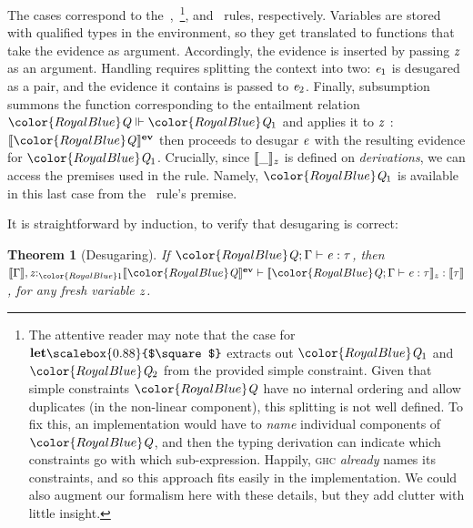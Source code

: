 \documentclass[acmsmall,usenames,dvipsnames,natbib=false,acmthm=false,screen]{acmart}
\newcommand{\constraintcolour}{\color{RoyalBlue}}
\newcommand{\constraintfont}[1]{{\constraintcolour#1}}
\newcommand{\multiplicitycolour}{\color{RoyalBlue}}
\newcommand{\multiplicityfont}[1]{{\multiplicitycolour#1}}
\newcommand{\dsterm}[2]{\llbracket #2 \rrbracket_{#1}}
\newcommand{\dstype}[1]{\llbracket #1 \rrbracket}
\newcommand{\dsevidence}[1]{\llbracket #1 \rrbracket^{\mathbf{ev}}}
\newcommand{\keyword}[1]{\mathbf{#1}}
\newcommand{\klet}{\keyword{let}}
\newcommand{\packbox}{\raisebox{-0.08ex}{\scalebox{0.88}{$\square$}}}
\newcommand{\kunpack}{\klet\packbox}
\theoremstyle{acmplain}
\newtheorem{theorem}{Theorem}[section]
\theoremstyle{acmdefinition}
\begin{document}
The cases correspond to the~,~\footnote{The attentive
reader may note that the case for $\kunpack$ extracts out $  \constraintfont{ \ottnt{Q_{{\mathrm{1}}}} }  $ and $  \constraintfont{ \ottnt{Q_{{\mathrm{2}}}} }  $
from the provided simple constraint. Given that simple constraints $  \constraintfont{ \ottnt{Q} }  $ have no
internal ordering and allow duplicates (in the non-linear component), this splitting
is not well defined. To fix this, an implementation would have to \emph{name} individual
components of $  \constraintfont{ \ottnt{Q} }  $, and then the typing derivation can indicate which constraints
go with which sub-expression. Happily, \textsc{ghc} \emph{already} names its constraints,
and so this approach fits easily in the implementation. We could also augment our formalism
here with these details, but they add clutter with little insight.}, and~ rules, respectively.
Variables are stored with qualified types in the environment, so they get
translated to functions that take the evidence as argument. Accordingly, the evidence
is inserted by passing $ \mathit{z} $ as an argument.
Handling  requires splitting the context into two: $ \mathit{e_{{\mathrm{1}}}} $ is desugared as a pair, and the evidence
it contains is passed to $ \mathit{e_{{\mathrm{2}}}} $. Finally, subsumption summons the function corresponding to the entailment relation $ \constraintfont{ \ottnt{Q} }   \Vdash   \constraintfont{ \ottnt{Q_{{\mathrm{1}}}} } $
and applies it to $ \mathit{z} $ : $  \dsevidence{\constraintfont{ \ottnt{Q} } }  $ then proceeds to desugar $ \mathit{e} $ with the resulting evidence for $  \constraintfont{ \ottnt{Q_{{\mathrm{1}}}} }  $.
Crucially, since $  \dsterm{ \ottmv{z} }{ \_ }  $ is defined on \emph{derivations}, we can access the premises used in the rule.
Namely, $  \constraintfont{ \ottnt{Q_{{\mathrm{1}}}} }  $ is available in this last case from the~ rule's premise.

It is straightforward by induction, to verify that desugaring is correct:
%
\begin{theorem}[Desugaring]
If $ \constraintfont{ \ottnt{Q} }   \ottsym{;}  \Gamma  \vdash  \ottnt{e}  \ottsym{:}  \tau$, then
$ \dstype{ \Gamma }   \ottsym{,}   \ottmv{z} {:}_{  \multiplicityfont{ \ottsym{1} }  }  \dsevidence{\constraintfont{ \ottnt{Q} } }    \vdash   \dsterm{ \ottmv{z} }{  \constraintfont{ \ottnt{Q} }   \ottsym{;}  \Gamma  \vdash  \ottnt{e}  \ottsym{:}  \tau }   \ottsym{:}   \dstype{ \tau } $, for any fresh
variable $ \mathit{z} $.
\end{theorem}
\end{document}
